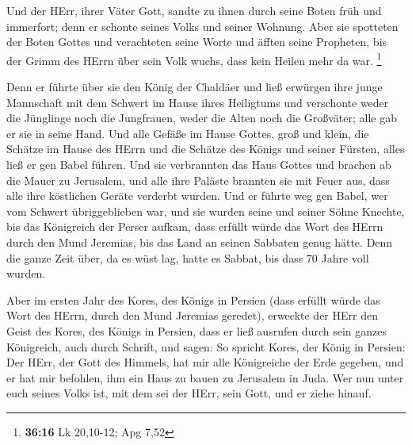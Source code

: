  Und der HErr, ihrer Väter Gott, sandte zu ihnen durch
seine Boten früh und immerfort; denn er schonte seines Volks und seiner
Wohnung.  Aber sie spotteten der Boten Gottes und
verachteten seine Worte und äfften seine Propheten, bis der Grimm des
HErrn über sein Volk wuchs, dass kein Heilen mehr da war. \footnote{\textbf{36:16}
  Lk 20,10-12; Apg 7,52}

 Denn er führte über sie den König der Chaldäer und ließ
erwürgen ihre junge Mannschaft mit dem Schwert im Hause ihres Heiligtums
und verschonte weder die Jünglinge noch die Jungfrauen, weder die Alten
noch die Großväter; alle gab er sie in seine Hand.  Und
alle Gefäße im Hause Gottes, groß und klein, die Schätze im Hause des
HErrn und die Schätze des Königs und seiner Fürsten, alles ließ er gen
Babel führen.  Und sie verbrannten das Haus Gottes und
brachen ab die Mauer zu Jerusalem, und alle ihre Paläste brannten sie
mit Feuer aus, dass alle ihre köstlichen Geräte verderbt wurden.
 Und er führte weg gen Babel, wer vom Schwert
übriggeblieben war, und sie wurden seine und seiner Söhne Knechte, bis
das Königreich der Perser aufkam,  dass erfüllt würde das
Wort des HErrn durch den Mund Jeremias, bis das Land an seinen Sabbaten
genug hätte. Denn die ganze Zeit über, da es wüst lag, hatte es Sabbat,
bis dass 70 Jahre voll wurden.

 Aber im ersten Jahr des Kores, des Königs in Persien (dass
erfüllt würde das Wort des HErrn, durch den Mund Jeremias geredet),
erweckte der HErr den Geist des Kores, des Königs in Persien, dass er
ließ ausrufen durch sein ganzes Königreich, auch durch Schrift, und
sagen:  So spricht Kores, der König in Persien: Der HErr,
der Gott des Himmels, hat mir alle Königreiche der Erde gegeben, und er
hat mir befohlen, ihm ein Haus zu bauen zu Jerusalem in Juda. Wer nun
unter euch seines Volks ist, mit dem sei der HErr, sein Gott, und er
ziehe hinauf.
